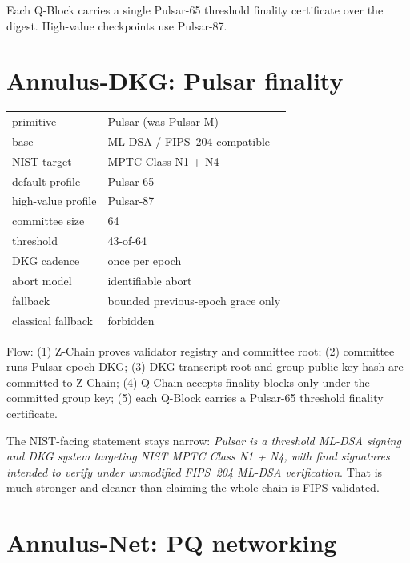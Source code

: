 \documentclass[11pt,a4paper]{article}
\begin{document}
Each Q-Block carries a single Pulsar-65 threshold finality
certificate over the digest. High-value checkpoints use Pulsar-87.

\section{Annulus-DKG: Pulsar finality}
\label{sec:annulus-dkg}

\begin{center}\small
\begin{tabular}{l l}
\toprule
primitive & Pulsar (was Pulsar-M) \\
base & ML-DSA / FIPS~204-compatible \\
NIST target & MPTC Class N1 + N4 \\
default profile & Pulsar-65 \\
high-value profile & Pulsar-87 \\
committee size & 64 \\
threshold & 43-of-64 \\
DKG cadence & once per epoch \\
abort model & identifiable abort \\
fallback & bounded previous-epoch grace only \\
classical fallback & forbidden \\
\bottomrule
\end{tabular}
\end{center}

\noindent
Flow: (1) Z-Chain proves validator registry and committee root;
(2) committee runs Pulsar epoch DKG; (3) DKG transcript root and
group public-key hash are committed to Z-Chain; (4) Q-Chain
accepts finality blocks only under the committed group key; (5)
each Q-Block carries a Pulsar-65 threshold finality certificate.

The NIST-facing statement stays narrow: \emph{Pulsar is a threshold
ML-DSA signing and DKG system targeting NIST MPTC Class N1 + N4,
with final signatures intended to verify under unmodified FIPS~204
ML-DSA verification}. That is much stronger and cleaner than
claiming the whole chain is FIPS-validated.

\section{Annulus-Net: PQ networking}
\label{sec:annulus-net}
\end{document}
